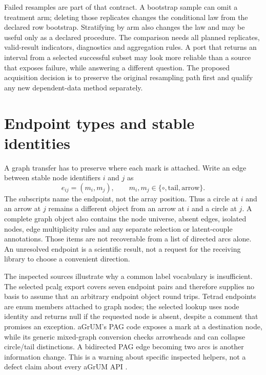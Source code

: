 Failed resamples are part of that contract. A bootstrap sample can omit a
treatment arm; deleting those replicates changes the conditional law from
the declared row bootstrap. Stratifying by arm also changes the law and may
be useful only as a declared procedure. The comparison needs all planned
replicates, valid-result indicators, diagnostics and aggregation rules.
A port that returns an interval from a selected successful subset may look
more reliable than a source that exposes failure, while answering a different
question. The proposed acquisition decision is to preserve the original
resampling path first and qualify any new dependent-data method separately.

\section{Endpoint types and stable identities}

A graph transfer has to preserve where each mark is attached. Write an edge
between stable node identifiers $i$ and $j$ as
\begin{equation}
  e_{ij}=(m_i,m_j),\qquad
  m_i,m_j\in\{\circ,\text{tail},\text{arrow}\}.
  \label{exec17:s9-edge-contract}
\end{equation}
The subscripts name the endpoint, not the array position. Thus a circle at $i$
and an arrow at $j$ remains a different object from an arrow at $i$ and a
circle at $j$. A complete graph object also contains the node universe, absent
edges, isolated nodes, edge multiplicity rules and any separate selection or
latent-couple annotations. Those items are not recoverable from a list of
directed arcs alone. An unresolved endpoint is a scientific result, not a
request for the receiving library to choose a convenient direction.

The inspected sources illustrate why a common label vocabulary is
insufficient. The selected pcalg export covers seven endpoint pairs and
therefore supplies no basis to assume that an arbitrary endpoint object round
trips. Tetrad endpoints are enum members attached to graph nodes; the selected
lookup uses node identity and returns null if the requested node is absent,
despite a comment that promises an exception. aGrUM's PAG code exposes a mark
at a destination node, while its generic mixed-graph conversion checks
arrowheads and can collapse circle/tail distinctions. A bidirected PAG edge
becoming two arcs is another information change. This is a warning about
specific inspected helpers, not a defect claim about every aGrUM API
\citep{exec13_latentr_primary,exec14_java_latent_sources,exec14_native_agrum}.

